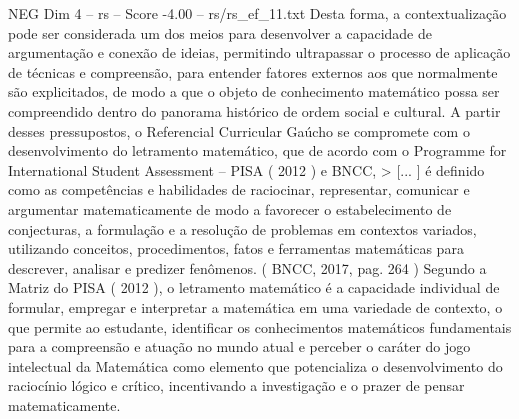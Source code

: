 \begin{textsample}{NEG Dim 4 – rs – Score -4.00 – rs/rs\_ef\_11.txt}
Desta forma, a contextualização pode ser considerada um dos meios para desenvolver a capacidade de argumentação e conexão de ideias, permitindo ultrapassar o processo de aplicação de técnicas e compreensão, para entender fatores externos aos que normalmente são explicitados, de modo a que o objeto de conhecimento matemático possa ser compreendido dentro do panorama histórico de ordem social e cultural.
A partir desses pressupostos, o Referencial Curricular Gaúcho se compromete com o desenvolvimento do letramento matemático, que de acordo com o Programme for International Student Assessment – PISA ( 2012 ) e BNCC, > [... ] é definido como as competências e habilidades de raciocinar, representar, comunicar e argumentar matematicamente de modo a favorecer o estabelecimento de conjecturas, a formulação e a resolução de problemas em contextos variados, utilizando conceitos, procedimentos, fatos e ferramentas matemáticas para descrever, analisar e predizer fenômenos. ( BNCC, 2017, pag. 264 ) Segundo a Matriz do PISA ( 2012 ), o letramento matemático é a capacidade individual de formular, empregar e interpretar a matemática em uma variedade de contexto, o que permite ao estudante, identificar os conhecimentos matemáticos fundamentais para a compreensão e atuação no mundo atual e perceber o caráter do jogo intelectual da Matemática como elemento que potencializa o desenvolvimento do raciocínio lógico e crítico, incentivando a investigação e o prazer de pensar matematicamente.

\end{textsample}

